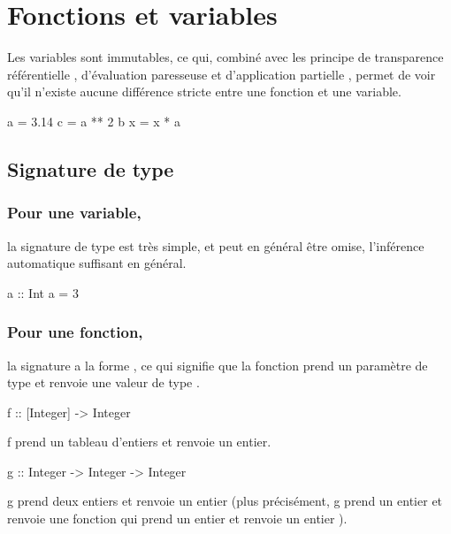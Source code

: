 \section{Fonctions et variables}
\label{functions-and-variables}

Les variables sont immutables, ce qui, combiné avec les principe de transparence référentielle , d'évaluation paresseuse  et d'application partielle , permet de voir qu'il n'existe aucune différence stricte entre une fonction et une variable.

\begin{haskellcode}
a = 3.14
c = a ** 2
b x = x * a
\end{haskellcode}

\subsection{Signature de type}

\subsubsection{Pour une variable,}

la signature de type est très simple, et peut en général être omise, l'inférence automatique suffisant en général.

\begin{haskellcode}
a :: Int
a = 3
\end{haskellcode}

\subsubsection{Pour une fonction,}

la signature a la forme , ce qui signifie que la fonction prend un paramètre de type  et renvoie une valeur de type .

\begin{haskellcode}
f :: [Integer] -> Integer
\end{haskellcode}

f prend un tableau d'entiers et renvoie un entier.

\begin{haskellcode}
g :: Integer -> Integer -> Integer
\end{haskellcode}

g prend deux entiers et renvoie un entier (plus précisément, g prend un entier et renvoie une fonction qui prend un entier et renvoie un entier ).

